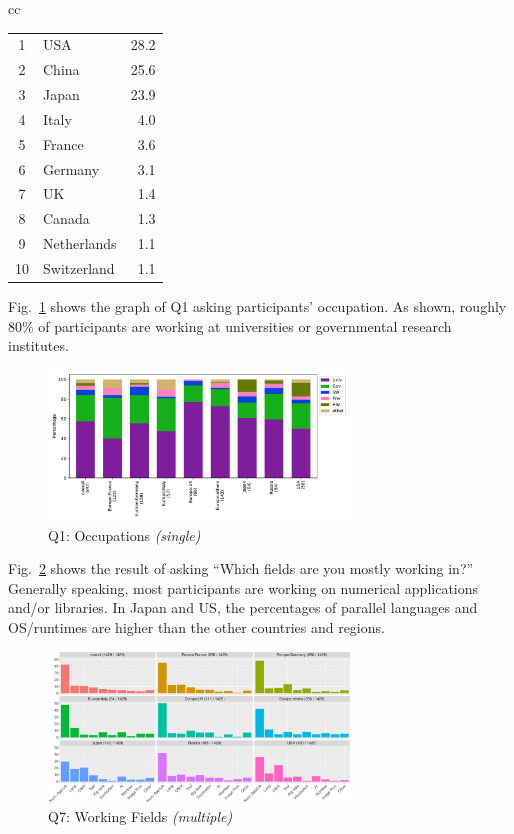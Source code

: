 \documentclass[conference,10pt,letterpaper]{IEEEtran}
\begin{document}
\begin{table}[htb]
\begin{center}
\begin{tabular}[t]{cc}
\begin{minipage}[t]{0.5\hsize}
\begin{center}
\begin{tabular}{c|l|r}
\hline%
1  & USA 	  & 28.2 \\%
2  & China 	  & 25.6 \\%
3  & Japan 	  & 23.9 \\%
4  & Italy	  & 4.0  \\%
5  & France	  & 3.6  \\%
6  & Germany 	  & 3.1  \\%
7  & UK		  & 1.4  \\%
8  & Canada	  & 1.3  \\%
9  & Netherlands  & 1.1  \\%
10 & Switzerland  & 1.1  \\%
\hline%
\end{tabular}%
\end{center}%
\end{minipage}%
%
\end{tabular}%
\end{center}%
\end{table}%
%
%
Fig.~\ref{fig:occupations} shows the graph of Q1 asking participants'
occupation. As shown, roughly 80\% of participants are working at 
universities or governmental research institutes.
%
\begin{figure}[htb]
\begin{center}
\includegraphics[width=8cm]{Figs/Q1.pdf}
\caption{Q1: Occupations {\it(single)}}
\label{fig:occupations}
\end{center}
\end{figure}

Fig.~\ref{fig:working-fields} shows the result of asking ``Which
fields are you mostly working in?'' Generally speaking, most
participants are working on numerical applications and/or
libraries. In Japan and US, the percentages of parallel languages and
OS/runtimes are higher than the other countries and regions.

\begin{figure}[htb]
\begin{center}
\includegraphics[width=8cm]{R-scripts/Q7.pdf}
\caption{Q7: Working Fields {\it(multiple)}}
\label{fig:working-fields}
\end{center}
\end{figure}
\end{document}
